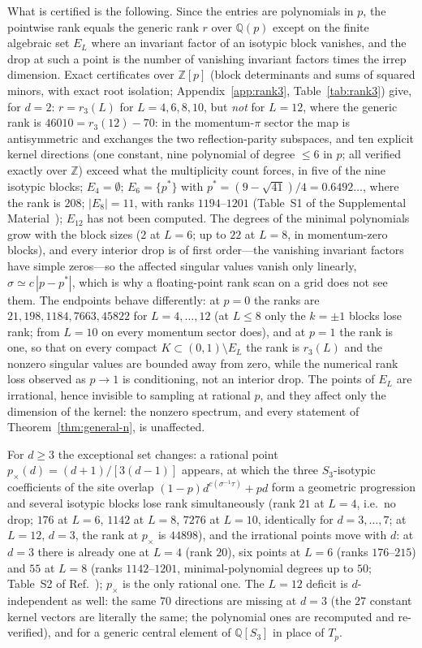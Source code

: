 \documentclass[aps,prx,reprint,superscriptaddress,nobibnotes,longbibliography]{revtex4-2}
\theoremstyle{remark}
\begin{document}
What is certified is the following.  Since the entries are polynomials in $p$, the pointwise rank equals the generic rank $r$ over $\mathbb Q(p)$ except on the finite algebraic set $E_L$ where an invariant factor of an isotypic block vanishes, and the drop at such a point is the number of vanishing invariant factors times the irrep dimension.  Exact certificates over $\mathbb Z[p]$ (block determinants and sums of squared minors, with exact root isolation; Appendix~\ref{app:rank3}, Table~\ref{tab:rank3}) give, for $d=2$: $r=r_3(L)$ for $L=4,6,8,10$, but \emph{not} for $L=12$, where the generic rank is $46010=r_3(12)-70$: in the momentum-$\pi$ sector the map is antisymmetric and exchanges the two reflection-parity subspaces, and ten explicit kernel directions (one constant, nine polynomial of degree $\le6$ in $p$; all verified exactly over $\mathbb Z$) exceed what the multiplicity count forces, in five of the nine isotypic blocks; $E_4=\emptyset$; $E_6=\{p^*\}$ with $p^*=(9-\sqrt{41})/4=0.6492\ldots$, where the rank is $208$; $|E_8|=11$, with ranks $1194$--$1201$ (Table~S1 of the Supplemental Material~\cite{SM}); $E_{12}$ has not been computed.  The degrees of the minimal polynomials grow with the block sizes ($2$ at $L=6$; up to $22$ at $L=8$, in momentum-zero blocks), and every interior drop is of first order---the vanishing invariant factors have simple zeros---so the affected singular values vanish only linearly, $\sigma\simeq c\,|p-p^*|$, which is why a floating-point rank scan on a grid does not see them.  The endpoints behave differently: at $p=0$ the ranks are $21,198,1184,7663,45822$ for $L=4,\ldots,12$ (at $L\le8$ only the $k=\pm1$ blocks lose rank; from $L=10$ on every momentum sector does), and at $p=1$ the rank is one, so that on every compact $K\subset(0,1)\setminus E_L$ the rank is $r_3(L)$ and the nonzero singular values are bounded away from zero, while the numerical rank loss observed as $p\to1$ is conditioning, not an interior drop.  The points of $E_L$ are irrational, hence invisible to sampling at rational $p$, and they affect only the dimension of the kernel: the nonzero spectrum, and every statement of Theorem~\ref{thm:general-n}, is unaffected.

For $d\ge3$ the exceptional set changes: a rational point $p_\times(d)=(d+1)/[3(d-1)]$ appears, at which the three $S_3$-isotypic coefficients of the site overlap $(1-p)d^{c(\sigma^{-1}\tau)}+pd$ form a geometric progression and several isotypic blocks lose rank simultaneously (rank $21$ at $L=4$, i.e.\ no drop; $176$ at $L=6$, $1142$ at $L=8$, $7276$ at $L=10$, identically for $d=3,\ldots,7$; at $L=12$, $d=3$, the rank at $p_\times$ is $44898$), and the irrational points move with $d$: at $d=3$ there is already one at $L=4$ (rank $20$), six points at $L=6$ (ranks $176$--$215$) and $55$ at $L=8$ (ranks $1142$--$1201$, minimal-polynomial degrees up to $50$; Table~S2 of Ref.~\cite{SM}); $p_\times$ is the only rational one.  The $L=12$ deficit is $d$-independent as well: the same $70$ directions are missing at $d=3$ (the $27$ constant kernel vectors are literally the same; the polynomial ones are recomputed and re-verified), and for a generic central element of $\mathbb Q[S_3]$ in place of $T_p$.
\end{document}
